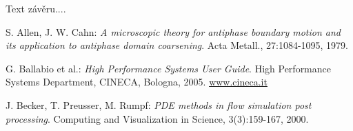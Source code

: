\documentclass[a4paper,11pt]{book}
\begin{document}

Text závěru....
\begin{thebibliography}{1}
S. Allen, J. W. Cahn: \emph{A microscopic theory
for antiphase boundary motion and its application to antiphase domain
coarsening}. Acta Metall., 27:1084-1095, 1979.

G. Ballabio et al.: \emph{High Performance Systems
User Guide}. High Performance Systems Department, CINECA, Bologna,
2005. \url{www.cineca.it}

J. Becker, T. Preusser, M. Rumpf: \emph{PDE methods
in flow simulation post processing}. Computing and Visualization in
Science, 3(3):159-167, 2000.\end{thebibliography}
\end{document}
